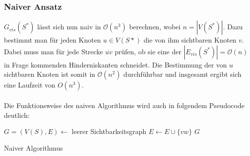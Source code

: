 \documentclass[a4paper, notitlepage, 12pt]{scrartcl}
\begin{document}
 \subsubsection{Naiver Ansatz}
 $G_{vis}(S^{*})$ lässt sich nun naiv in $\mathcal{O}(n^3)$ berechnen, wobei $n = |V(S^*)|$. Dazu bestimmt man für jeden Knoten $u \in V(S*)$ die von ihm sichtbaren Knoten $v$. Dabei muss man für jede Strecke $\overline{uv}$ prüfen, ob sie eine der $|E_{vis}(S^*)| = \mathcal{O}(n)$ in Frage kommenden Hinderniskanten schneidet. Die Bestimmung der von $u$ sichtbaren Knoten ist somit in $\mathcal{O}(n^2)$ durchführbar und insgesamt ergibt sich eine Laufzeit von $O(n^3)$. \\ \\
 Die Funktionsweise des naiven Algorithmus wird auch in folgendem Pseudocode deutlich: 
 \begin{algorithm}[H]
 \begin{algorithmic}
 	\State $G = (V(S),E) \gets$ leerer Sichtbarkeitsgraph
 	\State $E \gets E \cup \{vw\}$
 	\EndIf
 	\EndFor
 	\EndFor
 	\EndFor
 	\State \Return $G$
 	\EndFunction
 \end{algorithmic}
\caption{Naiver Algorithmus}
\end{algorithm}
\newpage
\end{document}
